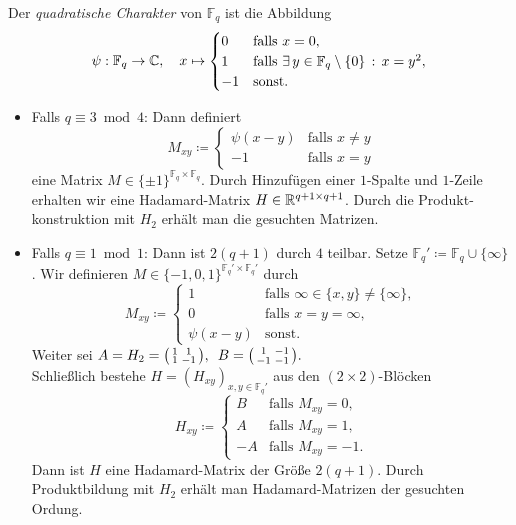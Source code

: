 \documentclass{cheat-sheet}
\newcommand{\F}{\mathbb{F}} %
\begin{document}
\begin{konstr}
  Der \emph{quadratische Charakter} von $\F_q$ ist die Abbildung
  \[
    \psi : \F_q \to \C, \quad
    x \mapsto \begin{cases}
      0 & \text{falls } x = 0, \\
      1 & \text{falls } \ex{y \in \F_q \setminus \{ 0 \}} x = y^2, \\
      -1 & \text{sonst.}
    \end{cases}
  \]
  \begin{itemize}
    \item Falls $q \equiv 3 \bmod{4}$: Dann definiert
    \[
      M_{xy} \coloneqq \begin{cases}
        \psi(x - y) & \text{falls } x \neq y \\
        -1 & \text{falls } x = y
      \end{cases}
    \]
    eine Matrix $M \in \{ \pm 1 \}^{\F_q \times \F_q}$.
    Durch Hinzufügen einer $1$-Spalte und $1$-Zeile erhalten wir eine Hadamard-Matrix $H \in \mathbb{R}^{q+1 \times q+1}$.
    Durch die Produkt- konstruktion mit $H_2$ erhält man die gesuchten Matrizen.
    \item Falls $q \equiv 1 \bmod{1}$:
    Dann ist $2 (q+1)$ durch $4$ teilbar.
    Setze $\F_q' \coloneqq \F_q \cup \{ \infty \}$.
    Wir definieren $M \in \{ -1, 0, 1 \}^{\F_q' \times \F_q'}$ durch
    \[
      M_{xy} \coloneqq \begin{cases}
        1 & \text{falls } \infty \in \{ x, y \} \neq \{ \infty \}, \\
        0 & \text{falls } x = y = \infty, \\
        \psi(x - y) & \text{sonst.}
      \end{cases}
    \]
    Weiter sei \enspace
    $
      A = H_2 = \begin{psmallmatrix}
        1 & 1 \\ 1 & -1
      \end{psmallmatrix}, \enspace
      B = \begin{psmallmatrix}
        1 & -1 \\ -1 & -1
      \end{psmallmatrix}.
    $ \\[2pt]
    Schließlich bestehe $H = (H_{xy})_{x, y \in \F_q'}$ aus den $(2 \times 2)$-Blöcken
    \[
      H_{xy} \coloneqq \begin{cases}
        B & \text{falls } M_{xy} = 0, \\
        A & \text{falls } M_{xy} = 1, \\
        -A & \text{falls } M_{xy} = -1.
      \end{cases}
    \]
    Dann ist $H$ eine Hadamard-Matrix der Größe $2 (q + 1)$.
    Durch Produktbildung mit $H_2$ erhält man Hadamard-Matrizen der gesuchten Ordung.
  \end{itemize}
\end{konstr}
\end{document}
